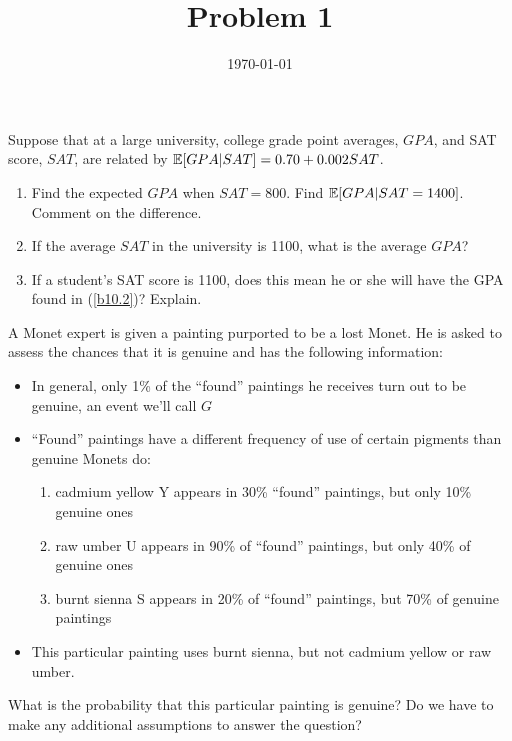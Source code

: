 
\title{Problem 1}
\date{\today}

\maketitle


\begin{problem}[Wooldridge B.10]
  Suppose that at a large university, college grade point averages,
  $GPA$, and SAT score, $SAT$, are related by $\mathbb{E}[GPA|SAT] = 0.70 +
  0.002 SAT$. 
  \begin{enumerate}
  \item Find the expected $GPA$ when $SAT=800$. Find
    $\mathbb{E}[GPA|SAT=1400]$. Comment on the difference.
  \item\label{b10.2} If the average $SAT$ in the university is 1100,
    what is the average $GPA$?
  \item If a student's SAT score is 1100, does this mean he or she
    will have the GPA found in (\ref{b10.2})? Explain.
  \end{enumerate}
\end{problem}

\begin{problem}\label{monet}
  A Monet expert is given a painting purported to be a lost Monet.  He
  is asked to assess the chances that it is genuine and has the
  following information:
  \begin{itemize}
  \item In general, only 1\% of the ``found'' paintings he receives
    turn out to be genuine, an event we’ll call $G$
  \item ``Found'' paintings have a different frequency of use of
    certain pigments than genuine Monets do:
    \begin{enumerate}
    \item cadmium yellow Y appears in 30\% ``found'' paintings, but
      only 10\% genuine ones
    \item raw umber U appears in 90\% of ``found'' paintings, but only
      40\% of genuine ones
    \item burnt sienna S appears in 20\% of ``found'' paintings, but
      70\% of genuine paintings
    \end{enumerate}
  \item This particular painting uses burnt sienna, but not cadmium
    yellow or raw umber. 
  \end{itemize}
  What is the probability that this particular painting is genuine? Do
  we have to make any additional assumptions to answer the question?
\end{problem}

